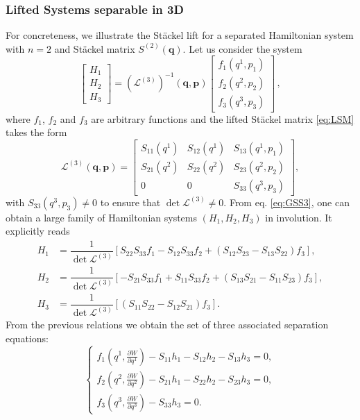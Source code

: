 \documentclass[10pt]{amsart}
\numberwithin{equation}{section}
\newcommand{\bs}{\boldsymbol}
\theoremstyle{definition}
\begin{document}
	\subsubsection{Lifted Systems separable in 3D}
	For concreteness, we illustrate the Stäckel lift for a separated Hamiltonian system with $n=2$ and Stäckel matrix $S^{(2)}(\bs{q})$. Let us consider the system
	\begin{equation} \label{eq:GSS3}
		\begin{bmatrix}
			H_1 \\
			H_2\\
			H_3
		\end{bmatrix}
		=(\mathcal{L}^{(3)})^{-1}(\bs{q}, \bs{p})
		\begin{bmatrix}
			f_1 (q^{1}, p_{1})\\
			f_2(q^{2}, p_{2})\\
			f_3(q^{3}, p_{3})
		\end{bmatrix}\,,
	\end{equation}
	where $f_{1}$, $f_{2}$ and $f_{3}$ are arbitrary functions and the lifted Stäckel matrix \eqref{eq:LSM} takes the form
	\begin{equation} \label{eq:3.12}
		\mathcal{L}^{(3)}(\bs{q}, \bs{p}) =
		\begin{bmatrix}
			S_{11} (q^{1}) & S_{12} (q^{1}) & S_{13} (q^{1},p_1) \\
			S_{21} (q^{2}) & S_{22} (q^{2}) & S_{23} (q^{2},p_2) \\
			0 & 0 & S_{33} (q^{3},p_3) 
		\end{bmatrix},%
	\end{equation}
	with $S_{33}(q^3,p_3)\neq 0$ to ensure that $\det \mathcal{L}^{(3)}\neq 0$. From eq. \eqref{eq:GSS3}, one can obtain a large family of Hamiltonian systems $(H_1, H_2, H_3)$ in involution. It explicitly reads
	\begin{equation}
		\begin{split}
			H_{1} &= \dfrac{1}{\det \mathcal{L}^{(3)}} \left[ S_{22} S_{33} f_{1} - S_{12} S_{33} f_{2} + ( S_{12} S_{23} - S_{13} S_{22} ) f_{3} \right], \\
			H_{2} &= \dfrac{1}{\det \mathcal{L}^{(3)}} \left[ - S_{21} S_{33} f_{1} + S_{11} S_{33} f_{2} + ( S_{13} S_{21} - S_{11} S_{23} ) f_{3} \right], \\
			H_{3} &= \dfrac{1}{\det \mathcal{L}^{(3)}} \left[ ( S_{11} S_{22} - S_{12} S_{21} ) f_{3} \right].
		\end{split}
	\end{equation}
	From the previous relations we obtain the set of three associated separation equations: 
	\begin{equation}
		\begin{cases}
			f_1\left(q^1, \frac{\partial W} {\partial q^1} \right)- S_{11} h_1-S_{12} h_2-S_{13}h_3=0, \\
			f_2\left(q^2, \frac{\partial W} {\partial q^2}\right)- S_{21} h_1-S_{22}h_2-S_{23}h_3 =0,\\
			f_3\left(q^3, \frac{\partial W} {\partial q^3}\right)- S_{33}h_3=0.
		\end{cases}
	\end{equation}
	
\end{document}
